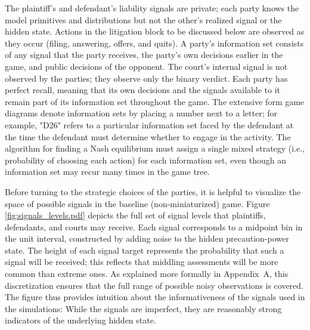 \documentclass{article}
\begin{document}
The plaintiff’s and defendant’s liability signals are private; each party knows the model primitives and distributions but not the other’s realized signal or the hidden state. Actions in the litigation block to be discussed below are observed as they occur (filing, answering, offers, and quits). A party's information set consists of any signal that the party receives, the party's own decisions earlier in the game, and public decisions of the opponent. The court’s internal signal is not observed by the parties; they observe only the binary verdict. Each party has perfect recall, meaning that its own decisions and the signals available to it remain part of its information set throughout the game. The extensive form game diagrams denote information sets by placing a number next to a letter; for example, "D26" refers to a particular information set faced by the defendant at the time the defendant must determine whether to engage in the activity. The algorithm for finding a Nash equilibrium must assign a single mixed strategy (i.e., probability of choosing each action) for each information set, even though an information set may recur many times in the game tree.

Before turning to the strategic choices of the parties, it is helpful to visualize the space of possible signals in the baseline (non-miniaturized) game. Figure \ref{fig:signals_levels.pdf} depicts the full set of signal levels that plaintiffs, defendants, and courts may receive. Each signal corresponds to a midpoint bin in the unit interval, constructed by adding noise to the hidden precaution-power state. The height of each signal target represents the probability that such a signal will be received; this reflects that middling assessments will be more common than extreme ones. As explained more formally in Appendix~A, this discretization ensures that the full range of possible noisy observations is covered. The figure thus provides intuition about the informativeness of the signals used in the simulations: While the signals are imperfect, they are reasonably strong indicators of the underlying hidden state. 
\end{document}
